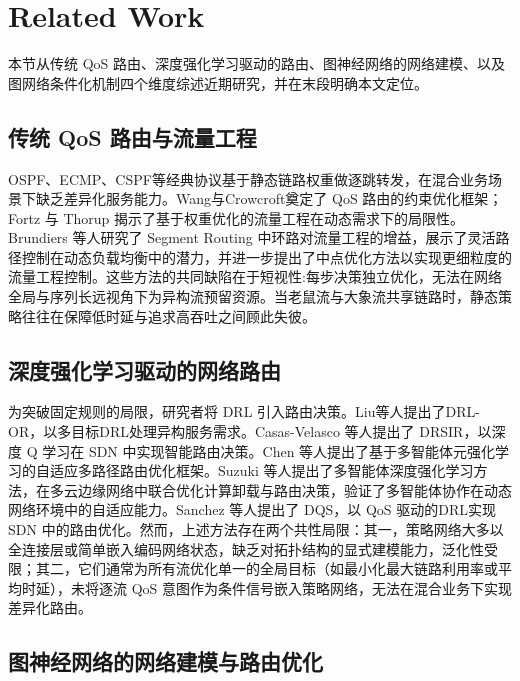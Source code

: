 \section{Related Work}
\label{sec:related}

本节从传统 QoS 路由、深度强化学习驱动的路由、图神经网络的网络建模、以及图网络条件化机制四个维度综述近期研究，并在末段明确本文定位。

\subsection{传统 QoS 路由与流量工程}

OSPF、ECMP、CSPF等经典协议基于静态链路权重做逐跳转发，在混合业务场景下缺乏差异化服务能力。Wang与Crowcroft奠定了 QoS 路由的约束优化框架\cite{Wang1996_QoSRouting}；Fortz 与 Thorup 揭示了基于权重优化的流量工程在动态需求下的局限性\cite{Fortz2000_TrafficEngineering}。Brundiers 等人研究了 Segment Routing 中环路对流量工程的增益，展示了灵活路径控制在动态负载均衡中的潜力\cite{Brundiers2021_Loops_SR_TE}，并进一步提出了中点优化方法以实现更细粒度的流量工程控制\cite{Brundiers2022_Midpoint_SR_INFOCOM}。这些方法的共同缺陷在于短视性:每步决策独立优化，无法在网络全局与序列长远视角下为异构流预留资源。当老鼠流与大象流共享链路时，静态策略往往在保障低时延与追求高吞吐之间顾此失彼。

\subsection{深度强化学习驱动的网络路由}

为突破固定规则的局限，研究者将 DRL 引入路由决策。Liu等人提出了DRL-OR，以多目标DRL处理异构服务需求\cite{Liu2021_DRLOr_INFOCOM}。Casas-Velasco 等人提出了 DRSIR，以深度 Q 学习在 SDN 中实现智能路由决策\cite{CasasVelasco2021_DRSIR_TNSM}。Chen 等人提出了基于多智能体元强化学习的自适应多路径路由优化框架\cite{Chen2022_MultiagentMeta_TNNLS}。Suzuki 等人提出了多智能体深度强化学习方法，在多云边缘网络中联合优化计算卸载与路由决策，验证了多智能体协作在动态网络环境中的自适应能力\cite{Suzuki2023_MADRL_Routing_TNSM}。Sanchez 等人提出了 DQS，以 QoS 驱动的DRL实现 SDN 中的路由优化\cite{Sanchez2024_DQS_JPDC}。然而，上述方法存在两个共性局限：其一，策略网络大多以全连接层或简单嵌入编码网络状态，缺乏对拓扑结构的显式建模能力，泛化性受限；其二，它们通常为所有流优化单一的全局目标（如最小化最大链路利用率或平均时延），未将逐流 QoS 意图作为条件信号嵌入策略网络，无法在混合业务下实现差异化路由。

\subsection{图神经网络的网络建模与路由优化}

